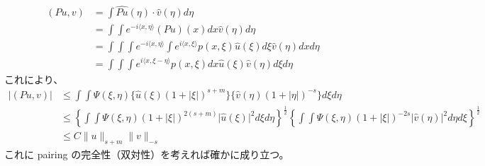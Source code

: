\begin{Proof}
  \begin{align*}
    (Pu , v)
    &= \int \widehat{Pu}(\eta) \cdot \hat{v}(\eta) d\eta \\
    &= \int \int e^{-i \langle x , \eta \rangle} (Pu)(x) dx \hat{v}(\eta) d\eta \\
    &= \int \int \int e^{-i \langle x , \eta \rangle} \int e^{i \langle x , \xi \rangle} p(x,\xi)  \hat{u}(\xi) d\xi \hat{v}(\eta) dx d\eta \\
    &= \int \int \int e^{i \langle x ,\xi - \eta \rangle} p(x,\xi) dx \hat{u}(\xi) \hat{v}(\eta) d\xi d\eta
  \end{align*}
  これにより、
  \begin{align*}
    \lvert (P u , v) \rvert
    &\leq \int \int \Psi (\xi , \eta) \{\hat{u}(\xi) (1 + \lvert \xi \rvert)^{s+m}\} \{\hat{v}(\eta)(1 + \lvert \eta \rvert)^{-s}\} d\xi d\eta\\
    &\leq \left\{\int \int \Psi(\xi , \eta) (1 + \lvert \xi \rvert)^{2(s+m)} \lvert \hat{u}(\xi) \rvert ^2 d\xi d\eta \right\}^{\frac{1}{2}} \left\{\int \int \Psi(\xi , \eta) (1 + \lvert \xi \rvert)^{-2s} \lvert \hat{v}(\eta) \rvert ^2 d\eta d\xi \right\}^{\frac{1}{2}} \\
    &\leq C \lVert u \rVert_{s+m} \lVert v \rVert_{-s}
  \end{align*}
  これに pairing の完全性（双対性）を考えれば確かに成り立つ。
\end{Proof}